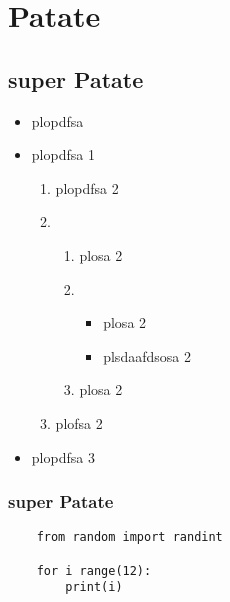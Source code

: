 \documentclass[nothmnum,use boldface,runin]{lebhart}
\begin{document}
\newpage
\section{Patate}
\lipsum[1]
\subsection{super Patate}
\lipsum[1]
\begin{itemize}
    \item plopdfsa
    \item plopdfsa 1
          \begin{enumerate}
              \item plopdfsa 2
              \item \begin{enumerate}
                        \item plosa 2
                        \item \begin{itemize}
                                  \item plosa 2
                                  \item plsdaafdsosa 2
                              \end{itemize}
                        \item plosa 2
                    \end{enumerate}
              \item plofsa 2
          \end{enumerate}
    \item plopdfsa 3
\end{itemize}
\lipsum[1]

\subsubsection{super Patate}
\lipsum[1]

\DNF


\begin{lstlisting}
    from random import randint

    for i range(12):
        print(i)
\end{lstlisting}
\end{document}
